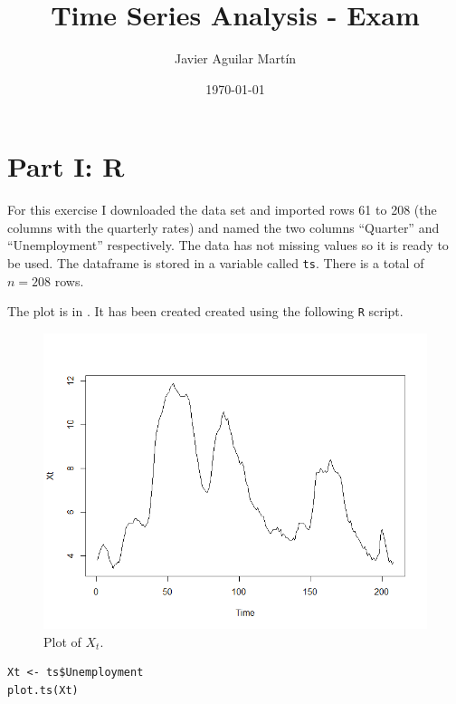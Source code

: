 \documentclass{article}
\theoremstyle{plain}
\theoremstyle{definition}
\newenvironment{exercise}[1]
  {\renewcommand\theexerciseaux{#1}\exerciseaux\label{ejer:#1}}
  {\endexerciseaux}
\newenvironment{sol}{\begin{trivlist}
 \item[\hskip \labelsep {\textit{Solution}.}\hskip \labelsep]}{\end{trivlist}}
\begin{document}
\title{Time Series Analysis - Exam }
\author{Javier Aguilar Martín}
\date{\today}
\maketitle

\section{Part I: R}

For this exercise I downloaded the data set and imported rows 61 to 208 (the columns with the quarterly rates) and named the two columns ``Quarter'' and ``Unemployment'' respectively. The data has not missing values so it is ready to be used. The dataframe is stored in a variable called \texttt{ts}. There is a total of $n=208$ rows.
\begin{exercise}{1}
\end{exercise}
\begin{sol}

The plot is in . It has been created created using the following \texttt{R} script.
\begin{figure}
\centering
\includegraphics[scale=0.5]{Xt}
\caption{Plot of $X_t$.}\label{Xt}
\end{figure}


\lstset{language=R,
showstringspaces=false,
tab=\rightarrowfill}
\begin{lstlisting}
Xt <- ts$Unemployment
plot.ts(Xt)
\end{lstlisting}
\end{sol}
\end{document}
